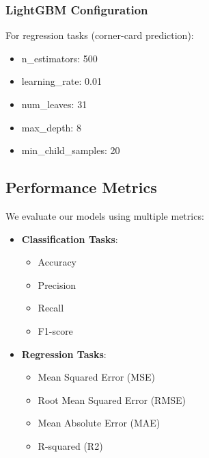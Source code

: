 \documentclass[conference]{IEEEtran}
\begin{document}
\subsubsection{LightGBM Configuration}
For regression tasks (corner-card prediction):
\begin{itemize}
\item n\_estimators: 500
\item learning\_rate: 0.01
\item num\_leaves: 31
\item max\_depth: 8
\item min\_child\_samples: 20
\end{itemize}

\subsection{Performance Metrics}
We evaluate our models using multiple metrics:
\begin{itemize}
\item \textbf{Classification Tasks}:
    \begin{itemize}
    \item Accuracy
    \item Precision
    \item Recall
    \item F1-score
    \end{itemize}
\item \textbf{Regression Tasks}:
    \begin{itemize}
    \item Mean Squared Error (MSE)
    \item Root Mean Squared Error (RMSE)
    \item Mean Absolute Error (MAE)
    \item R-squared (R2)
    \end{itemize}
\end{itemize}
\end{document}
